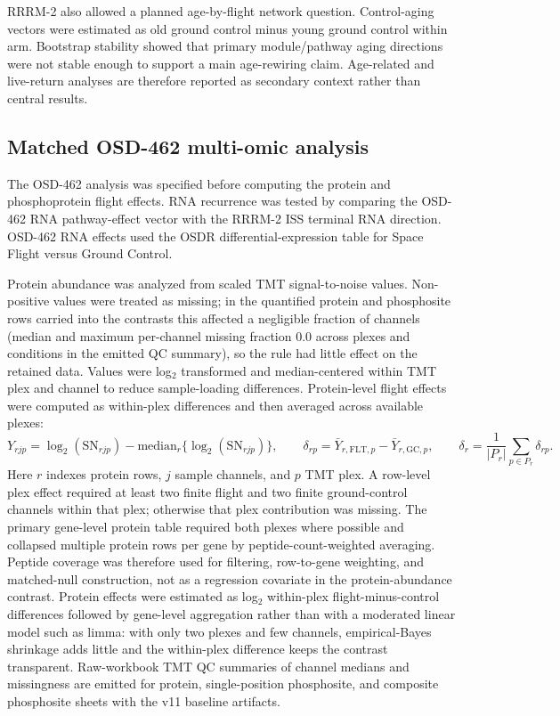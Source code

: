 \documentclass[11pt]{article}
\begin{document}
RRRM-2 also allowed a planned age-by-flight network question. Control-aging vectors were estimated as old ground control minus young ground control within arm. Bootstrap stability showed that primary module/pathway aging directions were not stable enough to support a main age-rewiring claim. Age-related and live-return analyses are therefore reported as secondary context rather than central results.

\subsection{Matched OSD-462 multi-omic analysis}

The OSD-462 analysis was specified before computing the protein and phosphoprotein flight effects. RNA recurrence was tested by comparing the OSD-462 RNA pathway-effect vector with the RRRM-2 ISS terminal RNA direction. OSD-462 RNA effects used the OSDR differential-expression table for Space Flight versus Ground Control.

Protein abundance was analyzed from scaled TMT signal-to-noise values. Non-positive values were treated as missing; in the quantified protein and phosphosite rows carried into the contrasts this affected a negligible fraction of channels (median and maximum per-channel missing fraction 0.0 across plexes and conditions in the emitted QC summary), so the rule had little effect on the retained data. Values were log$_2$ transformed and median-centered within TMT plex and channel to reduce sample-loading differences. Protein-level flight effects were computed as within-plex differences and then averaged across available plexes:
\[
Y_{r j p}=\log_2(\mathrm{SN}_{r j p})-\mathrm{median}_{r}\{\log_2(\mathrm{SN}_{r j p})\}, \qquad
\delta_{r p}=\bar{Y}_{r,\mathrm{FLT},p}-\bar{Y}_{r,\mathrm{GC},p}, \qquad
\delta_{r}=\frac{1}{|P_r|}\sum_{p\in P_r}\delta_{r p}.
\]
Here $r$ indexes protein rows, $j$ sample channels, and $p$ TMT plex. A row-level plex effect required at least two finite flight and two finite ground-control channels within that plex; otherwise that plex contribution was missing. The primary gene-level protein table required both plexes where possible and collapsed multiple protein rows per gene by peptide-count-weighted averaging. Peptide coverage was therefore used for filtering, row-to-gene weighting, and matched-null construction, not as a regression covariate in the protein-abundance contrast. Protein effects were estimated as log$_2$ within-plex flight-minus-control differences followed by gene-level aggregation rather than with a moderated linear model such as limma: with only two plexes and few channels, empirical-Bayes shrinkage adds little and the within-plex difference keeps the contrast transparent. Raw-workbook TMT QC summaries of channel medians and missingness are emitted for protein, single-position phosphosite, and composite phosphosite sheets with the v11 baseline artifacts.
\end{document}
